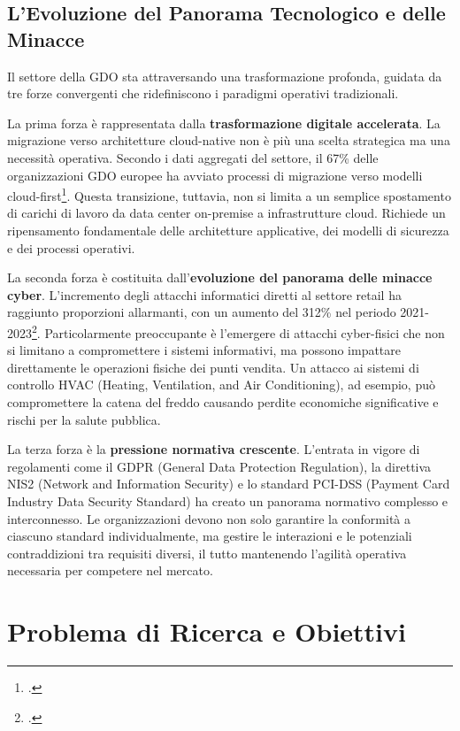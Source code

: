 \subsection{L'Evoluzione del Panorama Tecnologico e delle Minacce}

Il settore della GDO sta attraversando una trasformazione profonda, guidata da tre forze convergenti che ridefiniscono i paradigmi operativi tradizionali.

La prima forza è rappresentata dalla \textbf{trasformazione digitale accelerata}. La migrazione verso architetture cloud-native non è più una scelta strategica ma una necessità operativa. Secondo i dati aggregati del settore, il 67\% delle organizzazioni GDO europee ha avviato processi di migrazione verso modelli cloud-first\footcite{idc2024}. Questa transizione, tuttavia, non si limita a un semplice spostamento di carichi di lavoro da data center on-premise a infrastrutture cloud. Richiede un ripensamento fondamentale delle architetture applicative, dei modelli di sicurezza e dei processi operativi.

La seconda forza è costituita dall'\textbf{evoluzione del panorama delle minacce cyber}. L'incremento degli attacchi informatici diretti al settore retail ha raggiunto proporzioni allarmanti, con un aumento del 312\% nel periodo 2021-2023\footcite{enisa2024}. Particolarmente preoccupante è l'emergere di attacchi cyber-fisici che non si limitano a compromettere i sistemi informativi, ma possono impattare direttamente le operazioni fisiche dei punti vendita. Un attacco ai sistemi di controllo HVAC (Heating, Ventilation, and Air Conditioning), ad esempio, può compromettere la catena del freddo causando perdite economiche significative e rischi per la salute pubblica.

La terza forza è la \textbf{pressione normativa crescente}. L'entrata in vigore di regolamenti come il GDPR (General Data Protection Regulation), la direttiva NIS2 (Network and Information Security) e lo standard PCI-DSS (Payment Card Industry Data Security Standard) ha creato un panorama normativo complesso e interconnesso. Le organizzazioni devono non solo garantire la conformità a ciascuno standard individualmente, ma gestire le interazioni e le potenziali contraddizioni tra requisiti diversi, il tutto mantenendo l'agilità operativa necessaria per competere nel mercato.

\section{Problema di Ricerca e Obiettivi}

